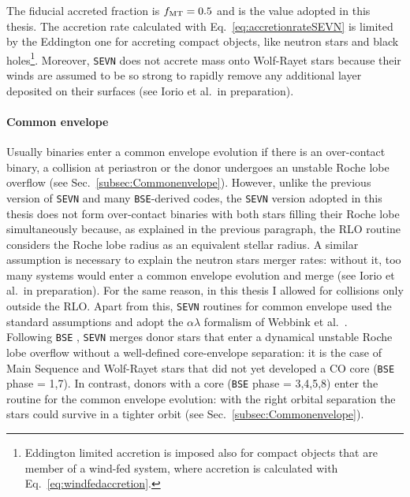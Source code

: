 \documentclass[a4paper,titlepage]{book}     	%
\begin{document}
The fiducial accreted fraction is $f_{\rm MT} = 0.5$ and is the value adopted in this thesis. The accretion rate calculated with Eq.\ \ref{eq:accretionrateSEVN} is limited by the Eddington one for accreting compact objects, like neutron stars and black holes\footnote{Eddington limited accretion is imposed also for compact objects that are member of a wind-fed system, where accretion is calculated with Eq.\ \ref{eq:windfedaccretion}.}. Moreover, \texttt{SEVN} does not accrete mass onto Wolf-Rayet stars because their winds are assumed to be so strong to rapidly remove any additional layer deposited on their surfaces (see Iorio et al.\ in preparation).




\paragraph{Common envelope} Usually binaries enter a common envelope evolution if there is an over-contact binary, a collision at periastron or the donor undergoes an unstable Roche lobe overflow (see Sec.\ \ref{subsec:Commonenvelope}). However, unlike the previous version of \texttt{SEVN} \cite{spera2019_mergingBBH} and many \texttt{BSE}-derived codes, the \texttt{SEVN} version adopted in this thesis does not form over-contact binaries with both stars filling their Roche lobe simultaneously because, as explained in the previous paragraph, the RLO routine considers the Roche lobe radius as an equivalent stellar radius. A similar assumption is necessary to explain the neutron stars merger rates: without it, too many systems would enter a common envelope evolution and merge (see Iorio et al.\ in preparation). For the same reason, in this thesis I allowed for collisions only outside the RLO. Apart from this, \texttt{SEVN} routines for common envelope used the standard assumptions and adopt the $\alpha \lambda$ formalism of Webbink et al.\ \cite{Webbink1984_CE}. \\

Following \texttt{BSE} \cite{Hurley2002}, \texttt{SEVN} merges donor stars that enter a dynamical unstable Roche lobe overflow without a well-defined core-envelope separation: it is the case of Main Sequence and Wolf-Rayet stars that did not yet developed a CO core (\texttt{BSE} phase = 1,7). In contrast, donors with a core (\texttt{BSE} phase = 3,4,5,8) enter the routine for the common envelope evolution: with the right orbital separation the stars could survive in a tighter orbit (see Sec.\ \ref{subsec:Commonenvelope}).
\end{document}
